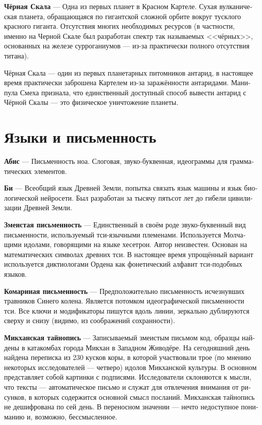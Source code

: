 \documentclass[a4paper,12pt,fleqn]{book}\usepackage{cooltooltips}\usepackage{polyglossia}\setdefaultlanguage[babelshorthands=true]{russian}\setotherlanguage{english}\defaultfontfeatures{Ligatures=TeX,Mapping=tex-text} \usepackage{xcolor}\definecolor{lightgray}{HTML}{bbbbbb}\color{lightgray}\newcommand{\ml}[3]{\textenglish{\textcolor{black}{#3}}}
\newcommand{\theterm}[3]{\textbf{\hypertarget{#1}{#2}} --- #3}
\begin{document}
\theterm{black-rock}
{Чёрная Скала}
{Одна из первых планет в Красном Картеле.
Сухая вулканическая планета, обращающаяся по гигантской сложной орбите вокруг тусклого красного гиганта.
Отсутствия многих необходимых ресурсов (в частности, именно на Черной Скале был разработан спектр так называемых <<чёрных>>, основанных на железе сурроганиумов --- из-за практически полного отсутствия титана).

Чёрная Скала --- один из первых планетарных питомников антарид, в настоящее время практически заброшена Картелем из-за заражённости антаридами.
Манипула Смеха признала, что единственный доступный способ вывести антарид с Чёрной Скалы --- это физическое уничтожение планеты.}

\chapter{Языки и письменность}

\theterm{abis}
{Абис}
{Письменность ноа.
Слоговая, звуко-буквенная, идеограммы для грамматических элементов.}

\theterm{bi}
{Би}
{Всеобщий язык Древней Земли, попытка связать язык машины и язык биологической нейросети.
Был разработан за тысячу пятьсот лет до гибели цивилизации Древней Земли.}

\theterm{snake-script}
{Змеистая письменность}
{Единственный в своём роде звуко-буквенный вид письменности, используемый тси-язычными племенами.
Используется Молчащими идолами, говорящими на языке хесетрон.
Автор неизвестен.
Основан на математических символах древних тси.
В настоящее время упрощённый вариант используется диктиологами Ордена как фонетический алфавит тси-подобных языков.}

\theterm{mosquito-script}
{Комариная письменность}
{Предположительно письменность исчезнувших травников Синего колена.
Является потомком идеографической письменности тси.
Все ключи и модификаторы пишутся вдоль линии, зеркально дублируются сверху и снизу (видимо, из соображений сохранности).}

\theterm{mikchan-cyphers}
{Микханская тайнопись}
{Записываемый змеистым письмом код, образцы найдены в катакомбах города Микхан в Западном Живодёре.
На сегодняшний день найдена переписка из 230 кусков коры, в которой участвовали трое (по мнению некоторых исследователей --- четверо) идолов Микханской культуры.
В основном представляет собой картинки с подписями.
Исследователи склоняются к мысли, что тексты --- автоматическое письмо и служат для отвлечения внимания от рисунков, в которых содержится основной смысл посланий.
Микханская тайнопись не дешифрована по сей день.
В переносном значении --- нечто недоступное пониманию и, возможно, бессмысленное.}
\end{document}
